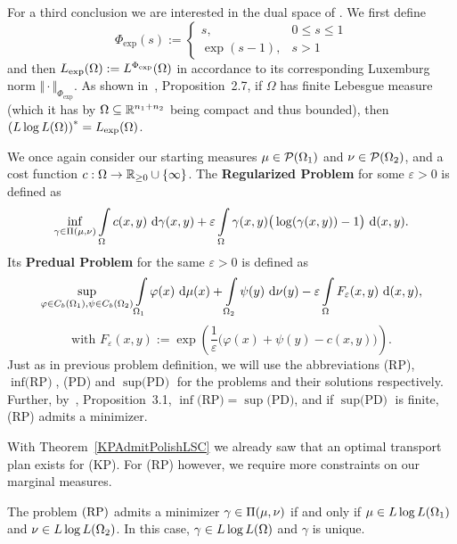 For a third conclusion we are interested in the dual space of \LLL{}. We first define
\[ \Phi_{\exp}(s) := \begin{cases}
	s, & 0 \le s \le 1 \\
	\exp(s - 1), & s > 1
\end{cases} \]
and then $\Lexp := \Orlicz{\Phi_{\exp}}$ in accordance to its corresponding Luxemburg norm $\Vert \cdot \Vert_{\Phi_{\exp}}$. As shown in~\cite{Cla2021}, Proposition~2.7, if $\Omega$ has finite Lebesgue measure (which it has by $\Omega \subseteq \R^{n_1 + n_2}$ being compact and thus bounded), then ${(\LLL)}^* = \Lexp$.

\begin{definition}\label{RegProbs}
	We once again consider our starting measures $\mu \in \PM{\Omega_1}$ and $\nu \in \PM{\Omega_2}$, and a cost function $\map[c]{\Omega}{\RZero \cup \{ \infty \}}$. The \textbf{Regularized Problem} for some $\varepsilon > 0$ is defined as
	\[ \inf\limits_{\gamma \in \TP{\mu}{\nu}} \int\limits_\Omega c(x, y)~\Dx[x, y]{\gamma} + \varepsilon \int\limits_\Omega \gamma(x, y) \big( \log(\gamma(x, y)) - 1 \big)~\Dx[x, y]{}. \]
	Its \textbf{Predual Problem} for the same $\varepsilon > 0$ is defined as
	\[ \sup\limits_{\varphi \in \CF[b]{\Omega_1}, \psi \in \CF[b]{\Omega_2}} \int\limits_{\Omega_1} \varphi(x)~\Dx{\mu} + \int\limits_{\Omega_2} \psi(y)~\Dx[y]{\nu} - \varepsilon \int\limits_\Omega F_{\varepsilon}(x, y)~\Dx[x, y]{}, \]
	\[ \text{with } F_{\varepsilon}(x, y) := \exp\left( \frac{1}{\varepsilon} \big( \varphi(x) + \psi(y) - c(x, y) \big) \right). \]
	Just as in previous problem definition, we will use the abbreviations (RP), $\inf \text{(RP)}$, (PD) and $\sup \text{(PD)}$ for the problems and their solutions respectively. Further, by~\cite{Cla2021}, Proposition~3.1, $\inf \text{(RP)} = \sup \text{(PD)}$, and if $\sup \text{(PD)}$ is finite, (RP) admits a minimizer.
\end{definition}

With Theorem~\ref{KPAdmitPolishLSC} we already saw that an optimal transport plan exists for (KP). For (RP) however, we require more constraints on our marginal measures.

\begin{theorem}\label{RegProbAdmitLLL}
	The problem$\text{\normalfont\ (RP)}$ admits a minimizer $\gamma \in \TP{\mu}{\nu}$ if and only if $\mu \in \LLL[\Omega_1]$ and $\nu \in \LLL[\Omega_2]$. In this case, $\gamma \in \LLL$ and $\gamma$ is unique.
\end{theorem}


